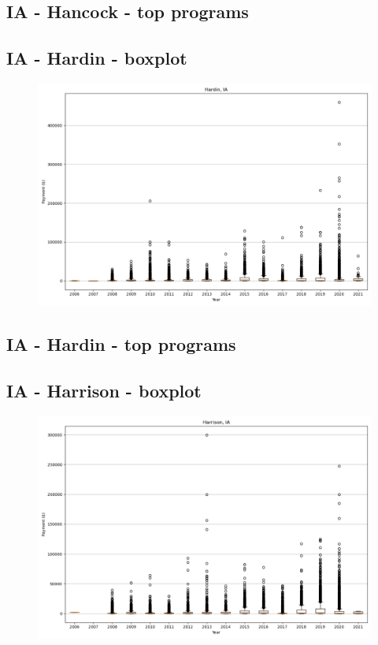 \subsection*{IA - Hancock - top programs}

\newpage
\subsection*{IA - Hardin - boxplot}
\begin{figure}[h]
\centering
\includegraphics[width=7in]{../output/boxplots/counties/Hardin-IA_boxplot.png}
\end{figure}


\subsection*{IA - Hardin - top programs}

\newpage
\subsection*{IA - Harrison - boxplot}
\begin{figure}[h]
\centering
\includegraphics[width=7in]{../output/boxplots/counties/Harrison-IA_boxplot.png}
\end{figure}


